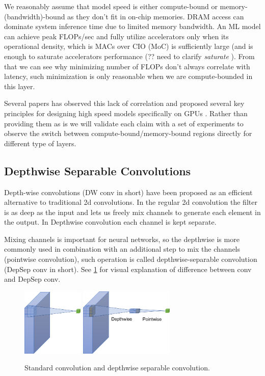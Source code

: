 We reasonably assume that model speed is either compute-bound or memory-(bandwidth)-bound as they don't fit in on-chip memories. DRAM access can dominate system inference time due to limited memory bandwidth. An ML model can achieve peak FLOPs/sec and fully utilize accelerators only when its operational density, which is MACs over CIO (MoC) is sufficiently large (and is enough to saturate accelerators performance (?? need to clarify \textit{saturate} ). 
From that we can see why minimizing number of FLOPs don't always correlate with latency, such minimization is only reasonable when we are compute-bounded in this layer. 

Several papers has observed this lack of correlation and proposed several key principles for designing high speed models specifically on GPUs \cite{radosavovic2020_designing} \cite{lee2020_compounding_improvements}. Rather than providing them as is we will validate each claim with a set of experiments to observe the switch between compute-bound/memory-bound regions directly for different type of layers.

\subsection{Depthwise Separable Convolutions}

Depth-wise convolutions (DW conv in short) have been proposed as an efficient alternative to traditional 2d convolutions. In the regular 2d convolution the filter is as deep as the input and lets us freely mix channels to generate each element in the output. In Depthwise convolution each channel is kept separate. 

Mixing channels is important for  neural networks, so the depthwise is more commonly used in combination with an additional step to mix the channels (pointwise convolution), such operation is called depthwise-separable convolution (DepSep conv in short). See \ref{fig: convs} for visual explanation of difference between conv and DepSep conv. 

\begin{figure}[h]
    \centering
         \includegraphics[width=0.26\textwidth]{images/conv.pdf}
         \hfil
         \includegraphics[width=0.4\textwidth]{images/conv_DepSep.pdf}
    \caption{Standard convolution and depthwise separable convolution.}   \label{fig: convs}
    \end{figure}


